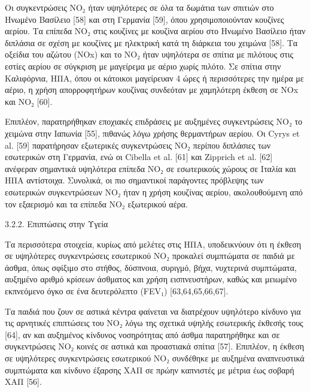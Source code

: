 Οι συγκεντρώσεις NO₂ ήταν υψηλότερες σε όλα τα δωμάτια των σπιτιών στο Ηνωμένο Βασίλειο [58] και στη Γερμανία [59], όπου χρησιμοποιούνταν κουζίνες αερίου. Τα επίπεδα NO₂ στις κουζίνες με κουζίνα αερίου στο Ηνωμένο Βασίλειο ήταν διπλάσια σε σχέση με κουζίνες με ηλεκτρική κατά τη διάρκεια του χειμώνα [58]. Τα οξείδια του αζώτου (NOx) και το NO₂ ήταν υψηλότερα σε σπίτια με πιλότους στις εστίες αερίου σε σύγκριση με μαγείρεμα με αέριο χωρίς πιλότο. Σε σπίτια στην Καλιφόρνια, ΗΠΑ, όπου οι κάτοικοι μαγείρευαν 4 ώρες ή περισσότερες την ημέρα με αέριο, η χρήση απορροφητήρων κουζίνας συνδεόταν με χαμηλότερη έκθεση σε NOx και NO₂ [60].

Επιπλέον, παρατηρήθηκαν εποχιακές επιδράσεις με αυξημένες συγκεντρώσεις NO₂ το χειμώνα στην Ιαπωνία [55], πιθανώς λόγω χρήσης θερμαντήρων αερίου. Οι Cyrys et al. [59] παρατήρησαν εξωτερικές συγκεντρώσεις NO₂ περίπου διπλάσιες των εσωτερικών στη Γερμανία, ενώ οι Cibella et al. [61] και Zipprich et al. [62] ανέφεραν σημαντικά υψηλότερα επίπεδα NO₂ σε εσωτερικούς χώρους σε Ιταλία και ΗΠΑ αντίστοιχα. Συνολικά, οι πιο σημαντικοί παράγοντες πρόβλεψης των εσωτερικών συγκεντρώσεων NO₂ ήταν η χρήση κουζίνας αερίου, ακολουθούμενη από τον εξαερισμό και τα επίπεδα NO₂ εξωτερικού αέρα.

3.2.2. Επιπτώσεις στην Υγεία

Τα περισσότερα στοιχεία, κυρίως από μελέτες στις ΗΠΑ, υποδεικνύουν ότι η έκθεση σε υψηλότερες συγκεντρώσεις εσωτερικού NO₂ προκαλεί συμπτώματα σε παιδιά με άσθμα, όπως σφίξιμο στο στήθος, δύσπνοια, συριγμό, βήχα, νυχτερινά συμπτώματα, αυξημένο αριθμό κρίσεων άσθματος και χρήση εισπνευστήρων, καθώς και μειωμένο εκπνεόμενο όγκο σε ένα δευτερόλεπτο (FEV₁) [63,64,65,66,67].

Τα παιδιά που ζουν σε αστικά κέντρα φαίνεται να διατρέχουν υψηλότερο κίνδυνο για τις αρνητικές επιπτώσεις του NO₂ λόγω της σχετικά υψηλής εσωτερικής έκθεσής τους [64], αν και αυξημένος κίνδυνος νοσηρότητας από άσθμα παρατηρήθηκε και σε συγκεντρώσεις NO₂ κοινές σε αστικά και προαστιακά σπίτια [57]. Επιπλέον, η έκθεση σε υψηλότερες συγκεντρώσεις εσωτερικού NO₂ συνδέθηκε με αυξημένα αναπνευστικά συμπτώματα και κίνδυνο έξαρσης ΧΑΠ σε πρώην καπνιστές με μέτρια έως σοβαρή ΧΑΠ [56].


